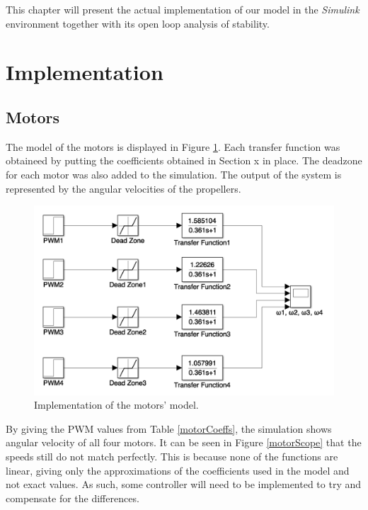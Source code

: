 This chapter will present the actual implementation of our model in the \textit{Simulink} environment together with its open loop analysis of stability.

\section{Implementation}
\subsection{Motors}
The model of the motors is displayed in Figure \ref{motorr}. Each transfer function was obtaineed by putting the coefficients obtained in Section x in place. The deadzone for each motor was also added to the simulation. The output of the system is represented by the angular velocities of the propellers. 

\begin{figure}[H]
  \centering
    \includegraphics[width=1.0\textwidth]{images/simulinkmotor.png}
	\caption{Implementation of the motors' model.}
	\label{motorr}
\end{figure}

By giving the PWM values from Table \ref{motorCoeffs}, the simulation shows angular velocity of all four motors. It can be seen in Figure \ref{motorScope} that the speeds still do not match perfectly. This is because none of the functions are linear, giving only the approximations of the coefficients used in the model and not exact values. As such, some controller will need to be implemented to try and compensate for the differences.

